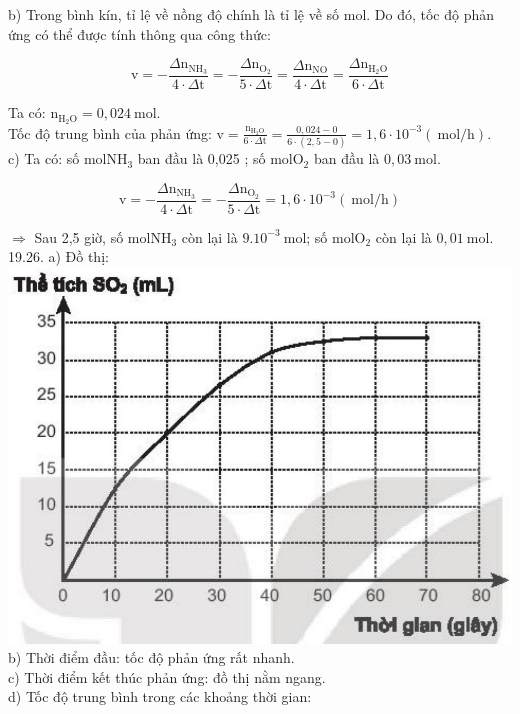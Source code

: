 \documentclass[10pt]{article}
\begin{document}
b) Trong bình kín, tỉ lệ về nồng độ chính là tỉ lệ về số mol. Do đó, tốc độ phản ứng có thể được tính thông qua công thức:

$$
\mathrm{v}=-\frac{\Delta \mathrm{n}_{\mathrm{NH}_{3}}}{4 \cdot \Delta \mathrm{t}}=-\frac{\Delta \mathrm{n}_{\mathrm{O}_{2}}}{5 \cdot \Delta \mathrm{t}}=\frac{\Delta \mathrm{n}_{\mathrm{NO}}}{4 \cdot \Delta \mathrm{t}}=\frac{\Delta \mathrm{n}_{\mathrm{H}_{2} \mathrm{O}}}{6 \cdot \Delta \mathrm{t}}
$$

Ta có: $\mathrm{n}_{\mathrm{H}_{2} \mathrm{O}}=0,024 \mathrm{~mol}$.\\
Tốc độ trung bình của phản ứng: $\mathrm{v}=\frac{\mathrm{n}_{\mathrm{H}_{2} \mathrm{O}}}{6 \cdot \Delta \mathrm{t}}=\frac{0,024-0}{6 \cdot(2,5-0)}=1,6 \cdot 10^{-3}(\mathrm{~mol} / \mathrm{h})$.\\
c) Ta có: số $\mathrm{mol} \mathrm{NH}_{3}$ ban đầu là 0,025 ; số $\mathrm{mol} \mathrm{O}_{2}$ ban đầu là $0,03 \mathrm{~mol}$.

$$
\mathrm{v}=-\frac{\Delta \mathrm{n}_{\mathrm{NH}_{3}}}{4 \cdot \Delta \mathrm{t}}=-\frac{\Delta \mathrm{n}_{\mathrm{O}_{2}}}{5 \cdot \Delta \mathrm{t}}=1,6 \cdot 10^{-3}(\mathrm{~mol} / \mathrm{h})
$$

$\Rightarrow$ Sau 2,5 giờ, số $\mathrm{mol} \mathrm{NH}_{3}$ còn lại là $9.10^{-3} \mathrm{~mol}$; số $\mathrm{mol} \mathrm{O}_{2}$ còn lại là $0,01 \mathrm{~mol}$.\\
19.26. a) Đồ thị:\\
\includegraphics[max width=\textwidth, center]{2025_10_23_ee735750217b2aca435cg-45}\\
b) Thời điểm đầu: tốc độ phản ứng rất nhanh.\\
c) Thời điểm kết thúc phản ứng: đồ thị nằm ngang.\\
d) Tốc độ trung bình trong các khoảng thời gian:
\end{document}

